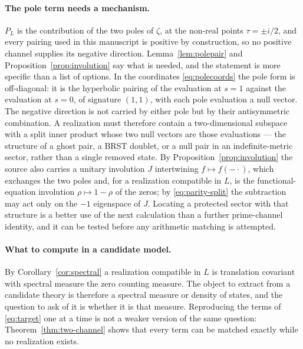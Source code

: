 \paragraph{The pole term needs a mechanism.}
$P_L$ is the contribution of the two poles of $\zeta$, at the non-real points
$\tau=\pm i/2$, and every pairing used in this manuscript is positive by
construction, so no positive channel supplies its negative direction.
Lemma~\ref{lem:polepair} and Proposition~\ref{prop:involution} say what is
needed, and the statement is more specific than a list of options. In the
coordinates \eqref{eq:polecoords} the pole form is off-diagonal: it is the
hyperbolic pairing of the evaluation at $s=1$ against the evaluation at
$s=0$, of signature $(1,1)$, with each pole evaluation a null vector. The
negative direction is not carried by either pole but by their antisymmetric
combination. A realization must therefore contain a two-dimensional subspace
with a split inner product whose two null vectors are those evaluations ---
the structure of a ghost pair, a BRST doublet, or a null pair in an
indefinite-metric sector, rather than a single removed state. By
Proposition~\ref{prop:involution} the source also carries a unitary
involution $J$ intertwining $f\mapsto f(-\cdot)$, which exchanges the two
poles and, for a realization compatible in $L$, is the functional-equation
involution $\rho\mapsto1-\rho$ of the zeros; by \eqref{eq:parity-split} the
subtraction may act only on the $-1$ eigenspace of $J$. Locating a protected
sector with that structure is a better use of the next calculation than a
further prime-channel identity, and it can be tested before any arithmetic
matching is attempted.

\paragraph{What to compute in a candidate model.}
By Corollary~\ref{cor:spectral} a realization compatible in $L$ is
translation covariant with spectral measure the zero counting measure. The
object to extract from a candidate theory is therefore a spectral measure or
density of states, and the question to ask of it is whether it is that
measure. Reproducing the terms of \eqref{eq:target} one at a time is not a
weaker version of the same question: Theorem~\ref{thm:two-channel} shows that
every term can be matched exactly while no realization exists.

